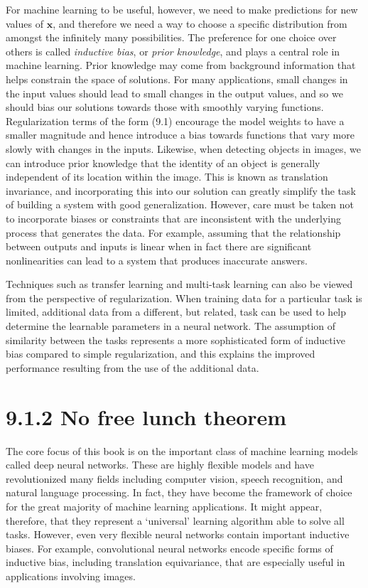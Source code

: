 \documentclass{article}
\begin{document}
For machine learning to be useful, however, we need to make predictions for new values of $\mathbf{x}$, and therefore we need a way to choose a specific distribution from amongst the infinitely many possibilities. The preference for one choice over others is called \emph{inductive bias}, or \emph{prior knowledge}, and plays a central role in machine learning. Prior knowledge may come from background information that helps constrain the space of solutions. For many applications, small changes in the input values should lead to small changes in the output values, and so we should bias our solutions towards those with smoothly varying functions. Regularization terms of the form (9.1) encourage the model weights to have a smaller magnitude and hence introduce a bias towards functions that vary more slowly with changes in the inputs. Likewise, when detecting objects in images, we can introduce prior knowledge that the identity of an object is generally independent of its location within the image. This is known as translation invariance, and incorporating this into our solution can greatly simplify the task of building a system with good generalization. However, care must be taken not to incorporate biases or constraints that are inconsistent with the underlying process that generates the data. For example, assuming that the relationship between outputs and inputs is linear when in fact there are significant nonlinearities can lead to a system that produces inaccurate answers.

Techniques such as transfer learning and multi-task learning can also be viewed from the perspective of regularization. When training data for a particular task is limited, additional data from a different, but related, task can be used to help determine the learnable parameters in a neural network. The assumption of similarity between the tasks represents a more sophisticated form of inductive bias compared to simple regularization, and this explains the improved performance resulting from the use of the additional data.


\section{9.1.2 No free lunch theorem}

The core focus of this book is on the important class of machine learning models called deep neural networks. These are highly flexible models and have revolutionized many fields including computer vision, speech recognition, and natural language processing. In fact, they have become the framework of choice for the great majority of machine learning applications. It might appear, therefore, that they represent a `universal' learning algorithm able to solve all tasks. However, even very flexible neural networks contain important inductive biases. For example, convolutional neural networks encode specific forms of inductive bias, including translation equivariance, that are especially useful in applications involving images.
\end{document}
